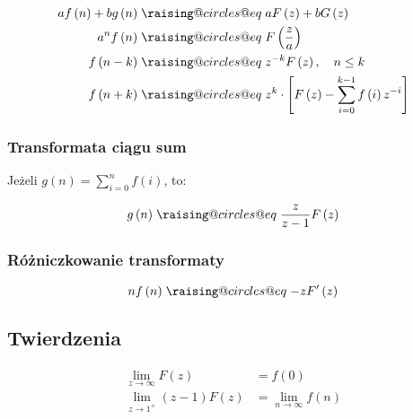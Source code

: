 \documentclass[a4paper,12pt]{article}
\makeatletter
\newcommand{\odpowiada}{\mathrel{\mathpalette\raising@circles@eq\relax}}
\newcommand{\raising@circles@eq}[2]{%
  \vphantom{#1+}%
  \vbox{
    \settowidth\unitlength{$#1\mspace{2mu}$}%
    \offinterlineskip\m@th
    \ialign{##\cr
      \hfil\small@circle{#1}$#1\mspace{1.5mu}$\cr\noalign{\vskip0.5\unitlength}
      $#1=$\cr\noalign{\post@vskip{+}{#1}}
      $#1\mspace{1.5mu}$\small@circle{#1}\hfill\cr\noalign{\post@vskip{-}{#1}}
    }%
  }%
}
\newcommand{\small@circle}[1]{%
  \smash{%
    \begin{picture}(1,1)
    \small@linethickness{#1}
    \put(0.5,0.5){\circle{1}}
    \end{picture}%
  }%
}
\newcommand{\small@linethickness}[1]{%
  \linethickness{%
      \ifx#1\displaystyle 0.8\fontdimen8\textfont3\else
      \ifx#1\textstyle 0.8\fontdimen8\textfont3\else
      \ifx#1\scriptstyle0.8\fontdimen8\scriptfont3\else
      1\fontdimen8\scriptscriptfont3\fi\fi\fi
  }%
}
\newcommand{\post@vskip}[2]{%
  \expandafter\vskip\expanded{%
    #1\ifx#2\scriptscriptstyle0.9\else\ifx#2\scriptstyle0.6\else0.3\fi\fi\unitlength
  }%
}
\makeatother
\begin{document}
\begin{multicols}{2}
\begin{align*}
    a f\left( n \right) + b g\left( n \right) &\odpowiada a F\left( z \right) + b G\left( z \right) \\
    a^n f \left( n \right) &\odpowiada F\left(\frac{z}{a}\right) \\ 
    f \left( n - k \right) &\odpowiada z^{ - k} F \left( z \right), \quad n \leq k \\
    f \left(n + k \right) &\odpowiada z^k \cdot \left[F\left(z\right) - \sum \limits^{k - 1}_{i = 0} f\left(i\right) z^{ - i}\right]
\end{align*}

\subsubsection*{Transformata ciągu sum}

Jeżeli $g\left(n\right) = \sum \limits^n_{i = 0} f \left(i\right)$, to:

\[
    g \left(n\right) \odpowiada \frac{z}{z - 1} F\left(z\right)
\]

\subsubsection*{Różniczkowanie transformaty}

\[
    n f \left( n \right) \odpowiada - z F' \left( z \right)
\]

\subsection*{Twierdzenia}

\begin{align*}
    \lim_{z \rightarrow \infty} F \left( z \right) &= f \left( 0 \right) \\
    \lim_{z \rightarrow 1^+} \left(z - 1 \right) F \left( z \right) &= \lim_{n \rightarrow \infty} f \left(n\right)
\end{align*}


\end{multicols}
\end{document}
